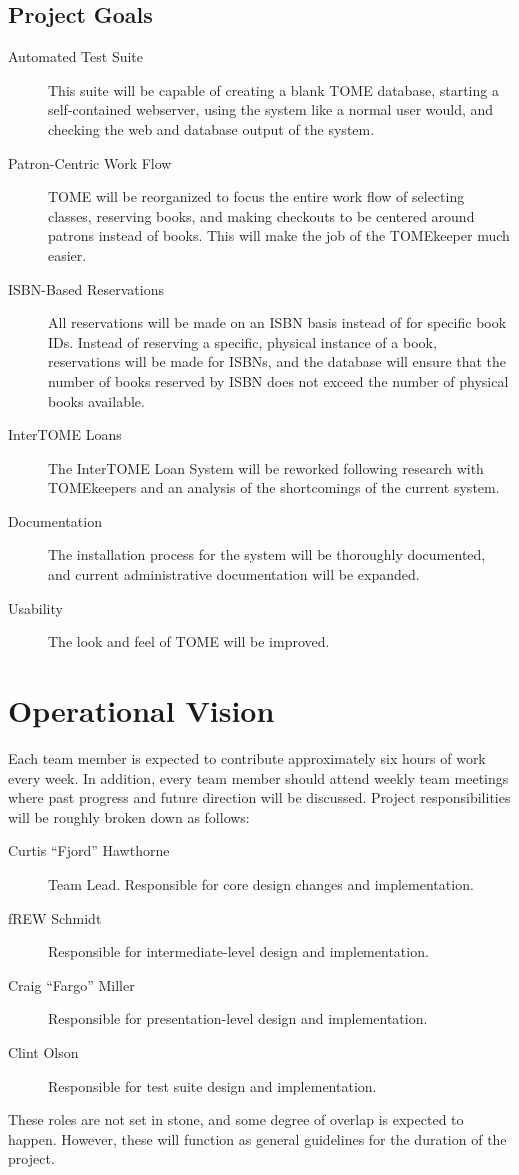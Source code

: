 \documentclass[12pt,titlepage]{article}
\begin{document}
\subsection{Project Goals}
\begin{description}
	\item[Automated Test Suite] This suite will be capable of creating a blank TOME database, starting a self-contained webserver, using the system like a normal user would, and checking the web and database output of the system.
	\item[Patron-Centric Work Flow] TOME will be reorganized to focus the entire work flow of selecting classes, reserving books, and making checkouts to be centered around patrons instead of books.  This will make the job of the TOMEkeeper much easier.
	\item[ISBN-Based Reservations] All reservations will be made on an ISBN basis instead of for specific book IDs.  Instead of reserving a specific, physical instance of a book, reservations will be made for ISBNs, and the database will ensure that the number of books reserved by ISBN does not exceed the number of physical books available.
	\item[InterTOME Loans] The InterTOME Loan System will be reworked following research with TOMEkeepers and an analysis of the shortcomings of the current system.
	\item[Documentation] The installation process for the system will be thoroughly documented, and current administrative documentation will be expanded.
	\item[Usability] The look and feel of TOME will be improved.
\end{description}
\section{Operational Vision}
Each team member is expected to contribute approximately six hours of work every week.  In addition, every team member should attend weekly team meetings where past progress and future direction will be discussed.  Project responsibilities will be roughly broken down as follows:
\begin{description}
	\item[Curtis ``Fjord'' Hawthorne] Team Lead.  Responsible for core design changes and implementation.
	\item[fREW Schmidt] Responsible for intermediate-level design and implementation.
	\item[Craig ``Fargo'' Miller] Responsible for presentation-level design and implementation.
	\item[Clint Olson] Responsible for test suite design and implementation.
\end{description}
These roles are not set in stone, and some degree of overlap is expected to happen.  However, these will function as general guidelines for the duration of the project.
\end{document}
